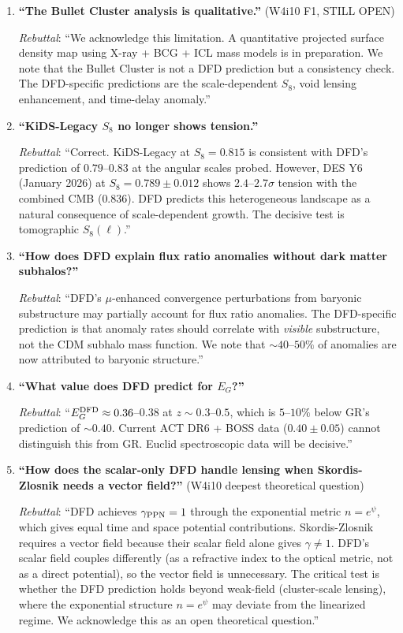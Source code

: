 \documentclass[11pt,a4paper]{article}
\begin{document}
\begin{enumerate}
\item \textbf{``The Bullet Cluster analysis is qualitative.''}
  (W4i10 F1, STILL OPEN)

  \textit{Rebuttal}: ``We acknowledge this limitation.  A
  quantitative projected surface density map using X-ray +
  BCG + ICL mass models is in preparation.  We note that
  the Bullet Cluster is not a DFD prediction but a consistency
  check.  The DFD-specific predictions are the scale-dependent
  $S_8$, void lensing enhancement, and time-delay anomaly.''

\item \textbf{``KiDS-Legacy $S_8$ no longer shows tension.''}

  \textit{Rebuttal}: ``Correct.  KiDS-Legacy at $S_8 = 0.815$
  is consistent with DFD's prediction of $0.79$--$0.83$ at
  the angular scales probed.  However, DES Y6 (January 2026)
  at $S_8 = 0.789 \pm 0.012$ shows $2.4$--$2.7\sigma$ tension
  with the combined CMB ($0.836$).  DFD predicts this
  heterogeneous landscape as a natural consequence of
  scale-dependent growth.  The decisive test is tomographic
  $S_8(\ell)$.''

\item \textbf{``How does DFD explain flux ratio anomalies
  without dark matter subhalos?''}

  \textit{Rebuttal}: ``DFD's $\mu$-enhanced convergence
  perturbations from baryonic substructure may partially
  account for flux ratio anomalies.  The DFD-specific
  prediction is that anomaly rates should correlate with
  \emph{visible} substructure, not the CDM subhalo mass
  function.  We note that $\sim 40$--$50\%$ of anomalies
  are now attributed to baryonic structure.''

\item \textbf{``What value does DFD predict for $E_G$?''}

  \textit{Rebuttal}: ``$E_G^{\rm DFD} \approx 0.36$--$0.38$
  at $z \sim 0.3$--$0.5$, which is $5$--$10\%$ below GR's
  prediction of $\sim 0.40$.  Current ACT DR6 + BOSS data
  ($0.40 \pm 0.05$) cannot distinguish this from GR.
  Euclid spectroscopic data will be decisive.''

\item \textbf{``How does the scalar-only DFD handle lensing
  when Skordis-Zlosnik needs a vector field?''} (W4i10 deepest
  theoretical question)

  \textit{Rebuttal}: ``DFD achieves $\gamma_{\rm PPN} = 1$
  through the exponential metric $n = e^\psi$, which gives
  equal time and space potential contributions.
  Skordis-Zlosnik requires a vector field because their
  scalar field alone gives $\gamma \neq 1$.  DFD's
  scalar field couples differently (as a refractive index
  to the optical metric, not as a direct potential), so the
  vector field is unnecessary.  The critical test is whether
  the DFD prediction holds beyond weak-field (cluster-scale
  lensing), where the exponential structure $n = e^\psi$ may
  deviate from the linearized regime.  We acknowledge this as
  an open theoretical question.''
\end{enumerate}
\end{document}
